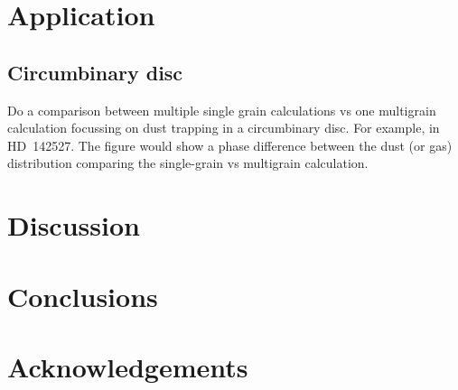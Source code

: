 \documentclass[fleqn,usenatbib]{mnras}
\begin{document}
\section{Application}

\subsection{Circumbinary disc}

Do a comparison between multiple single grain calculations vs one multigrain
calculation focussing on dust trapping in a circumbinary disc. For example, in
HD~142527. The figure would show a phase difference between the dust (or gas)
distribution comparing the single-grain vs multigrain calculation.

\section{Discussion}

\section{Conclusions}

\section*{Acknowledgements}
















\bsp %
\label{lastpage}
\end{document}
